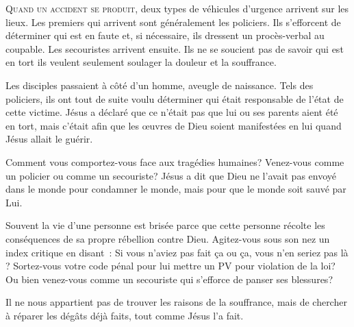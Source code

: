 




\lettrine{Q}{uand un accident se produit,} deux types de véhicules
 d'urgence arrivent sur les lieux. Les premiers qui arrivent
 sont généralement les policiers. Ils s'efforcent de déterminer
 qui est en faute et, si nécessaire, ils dressent un procès-verbal
 au coupable. Les secouristes arrivent ensuite.
 Ils ne se 
 soucient pas de savoir qui est en tort
 \ocadr ils veulent seulement soulager la douleur et la souffrance.

Les disciples passaient à côté d'un homme, aveugle de naissance.
 Tels des policiers, ils ont tout de suite voulu déterminer
 qui était responsable de l'état de cette victime.
 Jésus a déclaré que ce n'était pas que lui ou ses parents aient été en tort,
 mais c'était afin que les œuvres de Dieu soient manifestées
 en lui quand Jésus allait le guérir.


Comment vous comportez-vous face aux tragédies humaines?
 Venez-vous comme un policier ou comme un secouriste?
 Jésus a dit que Dieu ne l'avait pas envoyé dans le monde
 pour condamner le monde, mais 
 pour que le monde soit sauvé par Lui.

Souvent la vie d'une personne est brisée parce que cette personne
 récolte les conséquences de sa propre rébellion contre Dieu.
 Agitez-vous sous son nez un index critique en disant~: 
 \og Si vous n'aviez pas fait ça ou ça, vous n'en seriez pas là \fg{} ?
 Sortez-vous votre \og code pénal \fg{} pour lui mettre un PV
 pour violation de la loi? Ou bien venez-vous comme un secouriste
 qui s'efforce de panser ses blessures?

Il ne nous appartient pas de trouver les raisons de la souffrance,
 mais de chercher à réparer les dégâts déjà faits, tout comme Jésus l'a fait.

\dvrule




